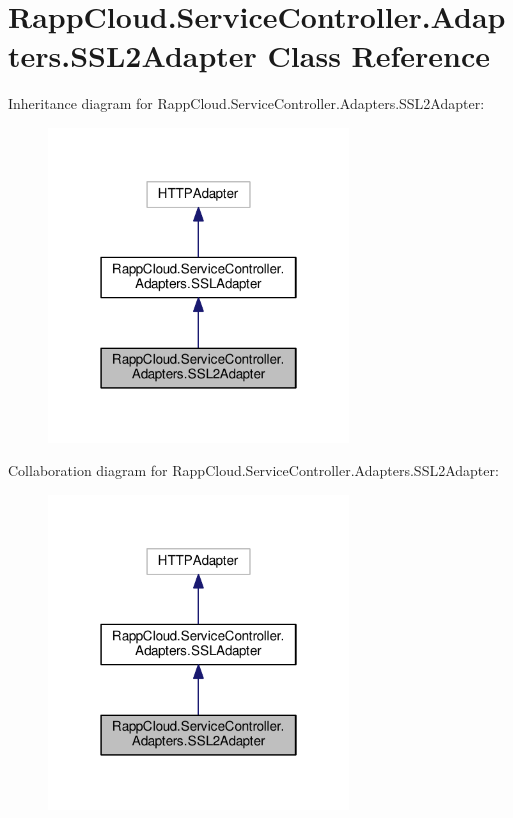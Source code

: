 \hypertarget{classRappCloud_1_1ServiceController_1_1Adapters_1_1SSL2Adapter}{\section{Rapp\-Cloud.\-Service\-Controller.\-Adapters.\-S\-S\-L2\-Adapter Class Reference}
\label{classRappCloud_1_1ServiceController_1_1Adapters_1_1SSL2Adapter}
}


Inheritance diagram for Rapp\-Cloud.\-Service\-Controller.\-Adapters.\-S\-S\-L2\-Adapter\-:
\nopagebreak
\begin{figure}[H]
\begin{center}
\leavevmode
\includegraphics[width=226pt]{classRappCloud_1_1ServiceController_1_1Adapters_1_1SSL2Adapter__inherit__graph}
\end{center}
\end{figure}


Collaboration diagram for Rapp\-Cloud.\-Service\-Controller.\-Adapters.\-S\-S\-L2\-Adapter\-:
\nopagebreak
\begin{figure}[H]
\begin{center}
\leavevmode
\includegraphics[width=226pt]{classRappCloud_1_1ServiceController_1_1Adapters_1_1SSL2Adapter__coll__graph}
\end{center}
\end{figure}
